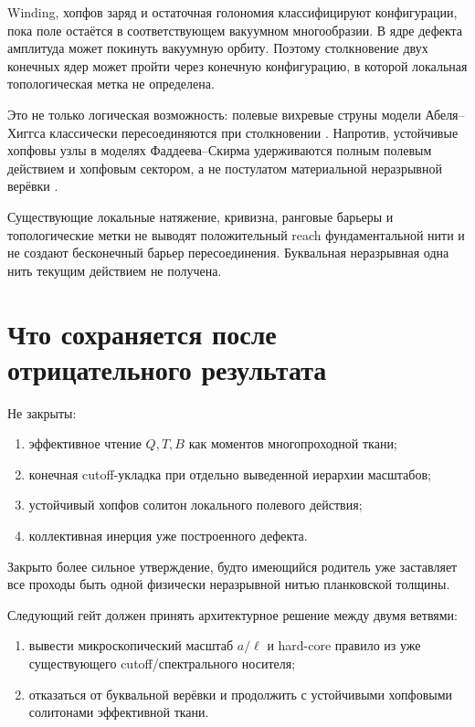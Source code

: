 Winding, хопфов заряд и остаточная голономия классифицируют конфигурации,
пока поле остаётся в соответствующем вакуумном многообразии. В ядре
дефекта амплитуда может покинуть вакуумную орбиту. Поэтому столкновение
двух конечных ядер может пройти через конечную конфигурацию, в которой
локальная топологическая метка не определена.

Это не только логическая возможность: полевые вихревые струны модели
Абеля--Хиггса классически пересоединяются при столкновении
\cite{single-thread-hanany-hashimoto2005,
single-thread-achucarro-verbiest2010}. Напротив, устойчивые хопфовы узлы
в моделях Фаддеева--Скирма удерживаются полным полевым действием и
хопфовым сектором, а не постулатом материальной неразрывной верёвки
\cite{single-thread-faddeev-niemi1997}.

\begin{theorem}
Существующие локальные натяжение, кривизна, ранговые барьеры и
топологические метки не выводят положительный reach фундаментальной нити
и не создают бесконечный барьер пересоединения. Буквальная неразрывная
одна нить текущим действием не получена.
\end{theorem}

\section{Что сохраняется после отрицательного результата}

Не закрыты:
\begin{enumerate}
 \item эффективное чтение $Q,T,B$ как моментов многопроходной ткани;
 \item конечная cutoff-укладка при отдельно выведенной иерархии
 масштабов;
 \item устойчивый хопфов солитон локального полевого действия;
 \item коллективная инерция уже построенного дефекта.
\end{enumerate}

Закрыто более сильное утверждение, будто имеющийся родитель уже заставляет
все проходы быть одной физически неразрывной нитью планковской толщины.

Следующий гейт должен принять архитектурное решение между двумя ветвями:
\begin{enumerate}
 \item вывести микроскопический масштаб $a/\ell$ и hard-core правило из
 уже существующего cutoff/спектрального носителя;
 \item отказаться от буквальной верёвки и продолжить с устойчивыми
 хопфовыми солитонами эффективной ткани.
\end{enumerate}

